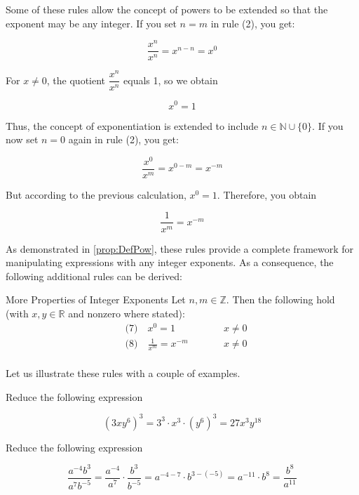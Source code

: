 Some of these rules allow the concept of powers to be extended so that the exponent may be any integer. If you set \(n = m\) in rule (2), you get:

\[
\frac{x^n}{x^n} = x^{n-n} = x^0
\]

For \(x\neq 0\), the quotient \(\dfrac{x^n}{x^n}\) equals 1, so we obtain

\[
x^0 = 1
\]

Thus, the concept of exponentiation is extended to include \(n \in \mathbb{N} \cup \{0\}\). If you now set \(n = 0\) again in rule (2), you get:

\[
\frac{x^0}{x^m} = x^{0-m} = x^{-m}
\]

But according to the previous calculation, \(x^0 = 1\). Therefore, you obtain

\begin{equation*}
 \frac{1}{x^m} = x^{-m}   
\end{equation*}

As demonstrated in \autoref{prop:DefPow}, these rules provide a complete framework for manipulating expressions with any integer exponents. As a consequence, the following additional rules can be derived:

\begin{proposition}{More Properties of Integer Exponents}
Let $n,m\in\mathbb{Z}$. Then the following hold (with $x,y\in\mathbb{R}$ and nonzero where stated):
\[
\begin{aligned}
&\text{(7)}\quad x^{0}=1   &\qquad&   x \neq 0  \\
&\text{(8)}\quad \frac{1}{x^{m}}=x^{-m} &\qquad& x \neq 0 \\
\end{aligned}
\]
\end{proposition}

Let us illustrate these rules with a couple of examples.

\begin{example} Reduce the following expression

    \begin{equation*}
\left(3 x y^6\right)^3=3^3 \cdot x^3 \cdot\left(y^6\right)^3=27 x^3 y^{18}
\end{equation*}
\end{example}

\begin{example} Reduce the following expression

\begin{equation*}
\frac{a^{-4} b^3}{a^7 b^{-5}}=\frac{a^{-4}}{a^7} \cdot \frac{b^3}{b^{-5}}=a^{-4-7} \cdot b^{3-(-5)}=a^{-11} \cdot b^8=\frac{b^8}{a^{11}}
\end{equation*}
\end{example}

